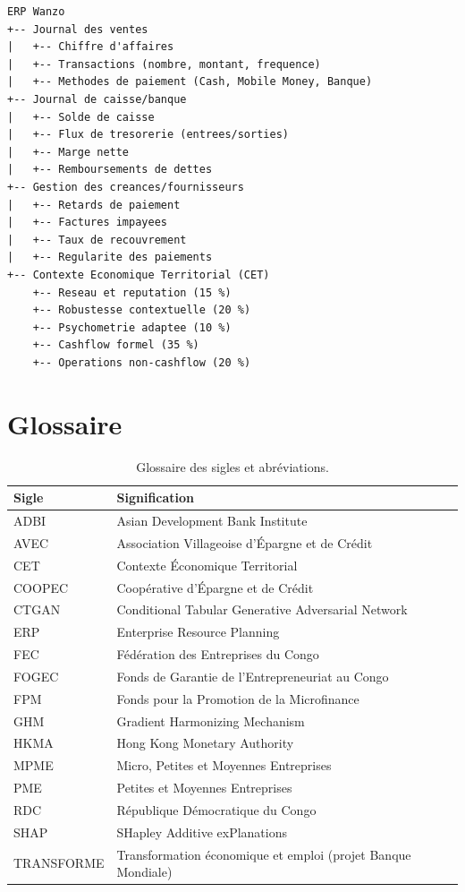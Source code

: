 \documentclass[12pt, a4paper, twocolumn]{article}
\begin{document}
\begin{appendices}
\begin{lstlisting}[caption={Architecture de données de l'ERP Wanzo}, label={lst:erp}]
ERP Wanzo
+-- Journal des ventes
|   +-- Chiffre d'affaires
|   +-- Transactions (nombre, montant, frequence)
|   +-- Methodes de paiement (Cash, Mobile Money, Banque)
+-- Journal de caisse/banque
|   +-- Solde de caisse
|   +-- Flux de tresorerie (entrees/sorties)
|   +-- Marge nette
|   +-- Remboursements de dettes
+-- Gestion des creances/fournisseurs
|   +-- Retards de paiement
|   +-- Factures impayees
|   +-- Taux de recouvrement
|   +-- Regularite des paiements
+-- Contexte Economique Territorial (CET)
    +-- Reseau et reputation (15 %)
    +-- Robustesse contextuelle (20 %)
    +-- Psychometrie adaptee (10 %)
    +-- Cashflow formel (35 %)
    +-- Operations non-cashflow (20 %)
\end{lstlisting}

\section{Glossaire}
\label{app:glossaire}

\begin{table}[htbp]
\centering
\caption{Glossaire des sigles et abréviations.}
\label{tab:glossaire}
\begin{tabularx}{\textwidth}{@{}lX@{}}
\toprule
\textbf{Sigle} & \textbf{Signification} \\
\midrule
ADBI & Asian Development Bank Institute \\
AVEC & Association Villageoise d'Épargne et de Crédit \\
CET & Contexte Économique Territorial \\
COOPEC & Coopérative d'Épargne et de Crédit \\
CTGAN & Conditional Tabular Generative Adversarial Network \\
ERP & Enterprise Resource Planning \\
FEC & Fédération des Entreprises du Congo \\
FOGEC & Fonds de Garantie de l'Entrepreneuriat au Congo \\
FPM & Fonds pour la Promotion de la Microfinance \\
GHM & Gradient Harmonizing Mechanism \\
HKMA & Hong Kong Monetary Authority \\
MPME & Micro, Petites et Moyennes Entreprises \\
PME & Petites et Moyennes Entreprises \\
RDC & République Démocratique du Congo \\
SHAP & SHapley Additive exPlanations \\
TRANSFORME & Transformation économique et emploi (projet Banque Mondiale) \\
\bottomrule
\end{tabularx}
\end{table}

\end{appendices}

\balance
\end{document}
